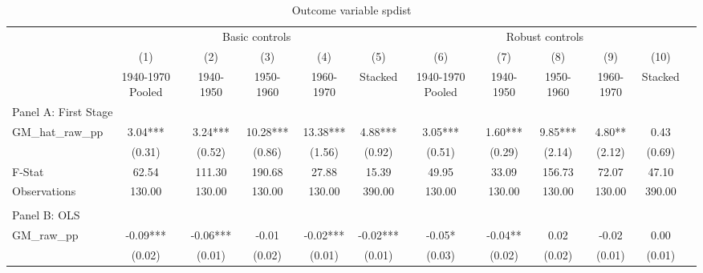  \begin{table}[htbp]\centering {} \begin{threeparttable} \caption{Outcome variable spdist} \begin{tabular}{l*{11}{c}} \toprule
          &\multicolumn{5}{c}{Basic controls}                                   &\multicolumn{5}{c}{Robust controls}                                  \\\cmidrule(lr){2-6}\cmidrule(lr){7-11}
          &\multicolumn{1}{c}{(1)}&\multicolumn{1}{c}{(2)}&\multicolumn{1}{c}{(3)}&\multicolumn{1}{c}{(4)}&\multicolumn{1}{c}{(5)}&\multicolumn{1}{c}{(6)}&\multicolumn{1}{c}{(7)}&\multicolumn{1}{c}{(8)}&\multicolumn{1}{c}{(9)}&\multicolumn{1}{c}{(10)}\\
          &\multicolumn{1}{c}{1940-1970 Pooled}&\multicolumn{1}{c}{1940-1950}&\multicolumn{1}{c}{1950-1960}&\multicolumn{1}{c}{1960-1970}&\multicolumn{1}{c}{Stacked}&\multicolumn{1}{c}{1940-1970 Pooled}&\multicolumn{1}{c}{1940-1950}&\multicolumn{1}{c}{1950-1960}&\multicolumn{1}{c}{1960-1970}&\multicolumn{1}{c}{Stacked}\\
\cmidrule(lr){1-11}
\multicolumn{10}{l}{Panel A: First Stage}\\
\cmidrule(lr){1-11}
GM\_hat\_raw\_pp&      3.04***&      3.24***&     10.28***&     13.38***&      4.88***&      3.05***&      1.60***&      9.85***&      4.80** &      0.43   \\
          &    (0.31)   &    (0.52)   &    (0.86)   &    (1.56)   &    (0.92)   &    (0.51)   &    (0.29)   &    (2.14)   &    (2.12)   &    (0.69)   \\
\midrule
F-Stat    &     62.54   &    111.30   &    190.68   &     27.88   &     15.39   &     49.95   &     33.09   &    156.73   &     72.07   &     47.10   \\
Observations&    130.00   &    130.00   &    130.00   &    130.00   &    390.00   &    130.00   &    130.00   &    130.00   &    130.00   &    390.00   \\
\cmidrule[\heavyrulewidth](lr){1-11} \\ \cmidrule[\heavyrulewidth](lr){1-11}
\multicolumn{10}{l}{Panel B: OLS}\\
\cmidrule(lr){1-11}
GM\_raw\_pp &     -0.09***&     -0.06***&     -0.01   &     -0.02***&     -0.02***&     -0.05*  &     -0.04** &      0.02   &     -0.02   &      0.00   \\
          &    (0.02)   &    (0.01)   &    (0.02)   &    (0.01)   &    (0.01)   &    (0.03)   &    (0.02)   &    (0.02)   &    (0.01)   &    (0.01)   \\

\end{tabular}
\end{threeparttable}
\end{table}
